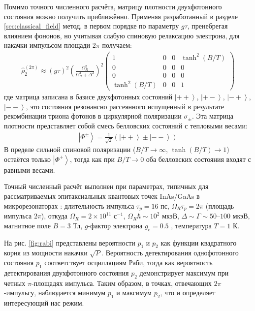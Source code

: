 \documentclass[11pt]{article}    %
\numberwithin{equation}{section}
\begin{document}
Помимо точного численного расчёта, матрицу плотности двухфотонного
состояния можно получить приближённо. Применяя разработанный в разделе
\ref{sec:classical_field} метод, в первом порядке по параметру $g\tau$,
пренебрегая влиянием фононов, но учитывая слабую спиновую релаксацию
электрона, для накачки импульсом площади $2\pi$ получаем:
\begin{gather}
    \hat{\rho}^{(2\pi)}_2 \approx \left( g \tau \right)^2 \left( \frac{ \Omega_R^2}{ \Omega_R^2 + \Delta^2} \right)^2
\begin{pmatrix}
    1 & 0 & 0 & \tanh^2\left( B/T \right) \\
    0 & 0 & 0 & 0 \\
    0 & 0 & 0 & 0 \\
    \tanh^2\left( B/T \right) & 0 & 0 & 1
\end{pmatrix}
    \label{eq:rho2_2pi}
\end{gather}
где матрица записана в базисе двухфотонных состояний
$\left| + + \right\rangle$, $\left| + - \right\rangle$, $\left| - + \right\rangle$, $\left| - - \right\rangle$,
это состояния резонансно рассеянного  испущенный в результате рекомбинации триона фотонов
в циркулярной поляризации $\sigma_\pm$.
Эта матрица плотности представляет собой смесь белловских состояний с тепловыми весами:
\begin{gather}
    \left| \Phi^{\pm} \right\rangle = \frac{1}{\sqrt{2}} \left( \left| + + \right\rangle \pm \left| - - \right\rangle \right)
\end{gather}
В пределе сильной спиновой поляризации ($B/T \to \infty$, $\tanh \left( B/T \right) \to 1$) остаётся только
$\left| \Phi^+ \right\rangle$, тогда как при $B/T \to 0$ оба белловских
состояния входят с равными весами.

Точный численный расчёт выполнен при параметрах, типичных для
рассматриваемых эпитаксиальных квантовых точек InAs/GaAs в
микрорезонаторах \cite{krainov2025, rakhlin2023}:
длительность импульса $\tau_p = 16$ пс,
$\Omega_R \tau_p = 2\pi$ (площадь импульса $2\pi$), откуда $\Omega_R = 2\times10^{11}$ с$^{-1}$,
$\Omega_R \hbar \sim 10^2$ мкэВ,
$\Delta \sim \Gamma \sim 50$--$100$ мкэВ,
магнитное поле $B = 3$ Тл, $g$-фактор электрона $g_e = 0.5$
\cite{yugova2009}, температура $T = 1$ К.

На рис. \ref{fig:rabi} представлены вероятности $p_1$ и $p_2$ как
функции квадратного корня из мощности накачки $\sqrt{P}$. Вероятность детектирования
однофотонного состояния $p_1$ соответствует осцилляциям Раби, тогда как
вероятность детектирования двухфотонного состояния $p_2$ демонстрирует максимум при
четных $\pi$-площадях импульса. %
Таким образом, в точках, отвечающих $2\pi$-импульсу,
наблюдается минимум $p_1$ и максимум $p_2$,
что и определяет интересующий нас режим.
\end{document}
